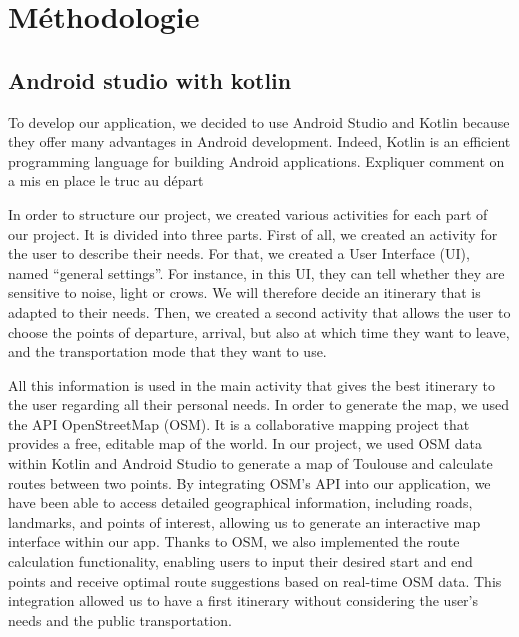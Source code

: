 \section{Méthodologie}

\subsection{Android studio with kotlin}
To develop our application, we decided to use Android Studio and Kotlin because they offer many advantages in Android development. Indeed, Kotlin is an efficient programming language for building Android applications. Expliquer comment on a mis en place le truc au départ\newline

In order to structure our project, we created various activities for each part of our project. It is divided into three parts. First of all, we created an activity for the user to describe their needs. For that, we created a User Interface (UI), named “general settings”. For instance, in this UI, they can tell whether they are sensitive to noise, light or crows. We will therefore decide an itinerary that is adapted to their needs. Then, we created a second activity that allows the user to choose the points of departure, arrival, but also at which time they want to leave, and the transportation mode that they want to use. \newline

All this information is used in the main activity that gives the best itinerary to the user regarding all their personal needs. In order to generate the map, we used the API OpenStreetMap (OSM). It is a collaborative mapping project that provides a free, editable map of the world. In our project, we used OSM data within Kotlin and Android Studio to generate a map of Toulouse and calculate routes between two points. By integrating OSM's API into our application, we have been able to access detailed geographical information, including roads, landmarks, and points of interest, allowing us to generate an interactive map interface within our app. Thanks to OSM, we also implemented the route calculation functionality, enabling users to input their desired start and end points and receive optimal route suggestions based on real-time OSM data. This integration allowed us to have a first itinerary without considering the user’s needs and the public transportation. \newline

